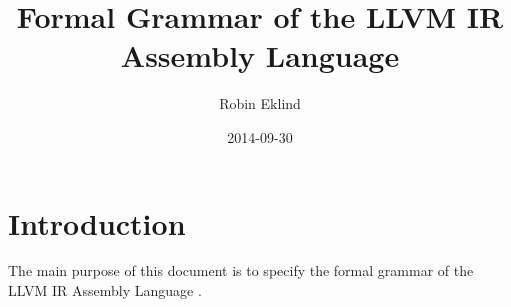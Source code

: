 \documentclass[12pt, a4paper]{article}
\title{Formal Grammar of the LLVM IR Assembly Language}
\author{Robin Eklind}
\date{2014-09-30}
\begin{document}
\maketitle

\pagebreak

\tableofcontents

\pagebreak


\section{Introduction}

The main purpose of this document is to specify the formal grammar of the LLVM
IR Assembly Language \cite{lang_ref}.

\pagebreak


\end{document}
